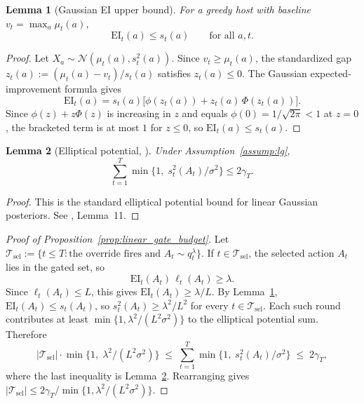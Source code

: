 \documentclass{article}
\newtheorem{lemma} {Lemma}
\newcommand{\Tc}{\mathcal{T}}
\newcommand{\surp}{\ell} %
\newcommand{\EI}{\mathrm{EI}} %
\begin{document}
\begin{lemma}[Gaussian EI upper bound]
\label{lem:ei_linear}
For a greedy host with baseline $v_t = \max_a \mu_t(a)$,
\[
\EI_t(a) \le s_t(a)
\qquad\text{for all } a, t.
\]
\end{lemma}

\begin{proof}
Let $X_a \sim \mathcal{N}(\mu_t(a), s_t^2(a))$.
Since $v_t \ge \mu_t(a)$, the standardized gap $z_t(a) := (\mu_t(a) - v_t)/s_t(a)$ satisfies $z_t(a) \le 0$.
The Gaussian expected-improvement formula gives
\[
\EI_t(a) = s_t(a)\bigl[\phi(z_t(a)) + z_t(a)\,\Phi(z_t(a))\bigr].
\]
Since $\phi(z) + z\Phi(z)$ is increasing in $z$ and equals $\phi(0) = 1/\sqrt{2\pi} < 1$ at $z = 0$, the bracketed term is at most $1$ for $z \le 0$, so $\EI_t(a) \le s_t(a)$.
\end{proof}

\begin{lemma}[Elliptical potential, \citealt{abbasi2011improved}]
\label{lem:elliptical}
Under Assumption~\ref{assump:lg},
\[
\sum_{t=1}^T \min\bigl\{1,\; s_t^2(A_t)/\sigma^2\bigr\} \le 2\gamma_T.
\]
\end{lemma}

\begin{proof}
This is the standard elliptical potential bound for linear Gaussian posteriors.
See \citet{abbasi2011improved}, Lemma~11.
\end{proof}

\begin{proof}[Proof of Proposition~\ref{prop:linear_gate_budget}]
Let $\Tc_{\mathrm{sel}} := \{t \le T : \text{the override fires and } A_t \sim q_t^\lambda\}$.
If $t \in \Tc_{\mathrm{sel}}$, the selected action $A_t$ lies in the gated set, so
\[
\EI_t(A_t)\,\surp_t(A_t) \ge \lambda.
\]
Since $\surp_t(A_t) \le L$, this gives $\EI_t(A_t) \ge \lambda/L$.
By Lemma~\ref{lem:ei_linear}, $\EI_t(A_t) \le s_t(A_t)$, so $s_t^2(A_t) \ge \lambda^2/L^2$ for every $t \in \Tc_{\mathrm{sel}}$.
Each such round contributes at least $\min\{1, \lambda^2/(L^2\sigma^2)\}$ to the elliptical potential sum.
Therefore
\[
|\Tc_{\mathrm{sel}}| \cdot \min\bigl\{1,\; \lambda^2/(L^2\sigma^2)\bigr\}
\;\le\;
\sum_{t=1}^T \min\bigl\{1,\; s_t^2(A_t)/\sigma^2\bigr\}
\;\le\;
2\gamma_T,
\]
where the last inequality is Lemma~\ref{lem:elliptical}.
Rearranging gives $|\Tc_{\mathrm{sel}}| \le 2\gamma_T / \min\{1, \lambda^2/(L^2\sigma^2)\}$.
\end{proof}




\end{document}
